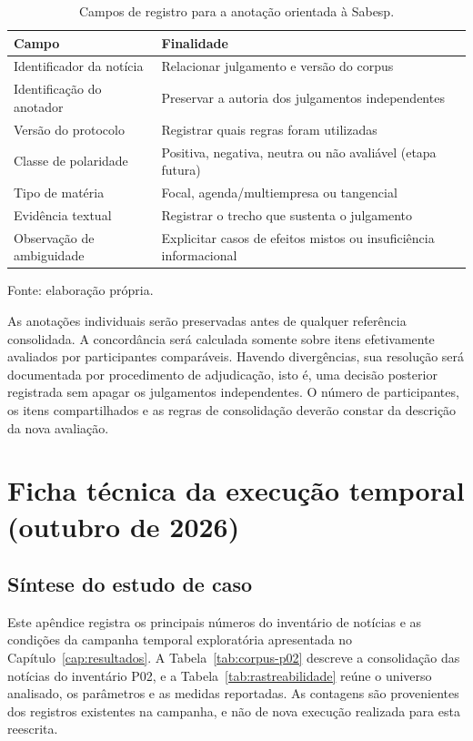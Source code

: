 \begin{table}[htbp]
\centering
\caption{Campos de registro para a anotação orientada à Sabesp.}
\label{tab:campos-anotacao}
\begin{tabularx}{\textwidth}{@{}P{0.32\textwidth}L@{}}
\toprule
Campo & Finalidade \\
\midrule
Identificador da notícia & Relacionar julgamento e versão do corpus \\
Identificação do anotador & Preservar a autoria dos julgamentos independentes \\
Versão do protocolo & Registrar quais regras foram utilizadas \\
Classe de polaridade & Positiva, negativa, neutra ou não avaliável (etapa futura) \\
Tipo de matéria & Focal, agenda/multiempresa ou tangencial \\
Evidência textual & Registrar o trecho que sustenta o julgamento \\
Observação de ambiguidade & Explicitar casos de efeitos mistos ou insuficiência informacional \\
\bottomrule
\end{tabularx}
\vspace{0.4em}
{\footnotesize Fonte: elaboração própria.}
\end{table}

As anotações individuais serão preservadas antes de qualquer referência consolidada. A concordância será calculada somente sobre itens efetivamente avaliados por participantes comparáveis. Havendo divergências, sua resolução será documentada por procedimento de adjudicação, isto é, uma decisão posterior registrada sem apagar os julgamentos independentes. O número de participantes, os itens compartilhados e as regras de consolidação deverão constar da descrição da nova avaliação.

\chapter[Ficha técnica da execução temporal (outubro de 2026)]{Ficha técnica da execução temporal\\(outubro de 2026)}
\label{ap:rastreabilidade}

\section{Síntese do estudo de caso}

Este apêndice registra os principais números do inventário de notícias e as condições da campanha temporal exploratória apresentada no Capítulo~\ref{cap:resultados}. A Tabela~\ref{tab:corpus-p02} descreve a consolidação das notícias do inventário P02, e a Tabela~\ref{tab:rastreabilidade} reúne o universo analisado, os parâmetros e as medidas reportadas. As contagens são provenientes dos registros existentes na campanha, e não de nova execução realizada para esta reescrita.

